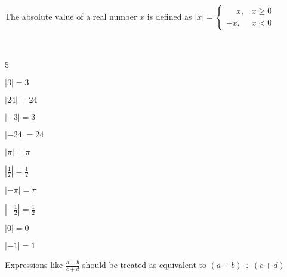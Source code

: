 \documentclass[crop=false,class=article,oneside]{standalone}
\begin{document}
        \begin{definition}
            \label{definiiton:North_Shore_Absolute_Value_Def}
            The absolute value of a real number $x$ is
            defined as
            $|x|=\begin{cases}%
                \phantom{-}x, & x\geq 0\\%
                -x, & x<0%
            \end{cases}$
        \end{definition}
        \begin{example}
            \
            \begin{enumerate}
            \end{enumerate}
        \end{example}
        \begin{remark}
            \label{remark:North_Shore_Rational_Expressions}
            Expressions like $\frac{a+b}{c+d}$ should be treated
            as equivalent to ${(a+b)}\div{(c+d)}$
        \end{remark}
\end{document}
